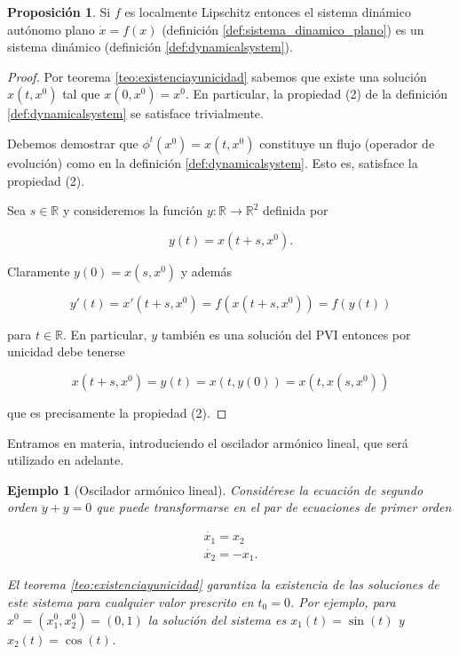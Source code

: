 \documentclass[11pt]{book}
\theoremstyle{definition}
\numberwithin{definition}{section}
\theoremstyle{theorem}
\newtheorem{proposition}{Proposición}
\numberwithin{theorem}{section}
\numberwithin{lemma}{section}
\numberwithin{corollary}{section}
\theoremstyle{plain}
\newtheorem{example}{Ejemplo}
\numberwithin{example}{section}
\newcommand{\R}{{\ensuremath{\mathbb{R}}}}
\begin{document}
\begin{proposition}Si $f$ es localmente Lipschitz entonces el sistema dinámico autónomo plano $\dot{x} = f(x)$ (definición \ref{def:sistema_dinamico_plano}) es un sistema dinámico (definición \ref{def:dynamicalsystem}).
\begin{proof}

Por teorema \ref{teo:existenciayunicidad} sabemos que existe una solución $x(t,x^0)$ tal que $x(0,x^0) = x^0$. En particular, la propiedad (2) de la definición \ref{def:dynamicalsystem} se satisface trivialmente.

Debemos demostrar que $\phi^t(x^0) = x(t,x^0)$ constituye un flujo (operador de evolución) como en la definición \ref{def:dynamicalsystem}. Esto es, satisface la propiedad (2).

Sea $s \in \R$ y consideremos la función $y: \R \to \R^2$ definida por 

$$ y(t) = x(t+s, x^0).$$

Claramente $y(0) = x(s,x^0)$ y además

$$ y'(t) = x'(t+s,x^0) = f(x(t+s, x^0)) = f(y(t))  $$

para $t \in \R$. En particular, $y$ también es una solución del PVI entonces por unicidad debe tenerse

$$ x(t+s,x^0) = y(t) = x(t, y(0)) = x(t, x(s,x^0))$$

que es precisamente la propiedad (2).
\end{proof}
\end{proposition}

Entramos en materia, introduciendo el oscilador armónico lineal, que será utilizado en adelante.

\begin{example}[Oscilador armónico lineal] \label{ex:osciladorarmonico} Considérese la ecuación de segundo orden $\ddot{y} + y = 0$ que puede transformarse en el par de ecuaciones de primer orden

\begin{equation} \label{eq:osciladorarmonico}
	\begin{array}{l}
		\dot{x_1} = x_2 \\
		\dot{x_2} = -x_1.
	\end{array}
\end{equation}

El teorema \ref{teo:existenciayunicidad} garantiza la existencia de las soluciones de este sistema para cualquier valor prescrito en $t_0 = 0$. Por ejemplo, para $x^0 = (x_1^0,x_2^0) = (0,1)$ la solución del sistema es $x_1(t) = \sin(t)$ y $x_2(t) = \cos(t)$.
\end{example}
\end{document}
